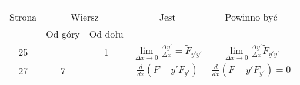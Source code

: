 \documentclass[a4paper,11pt]{article}
\begin{document}
\begin{center}

  \begin{tabular}{|c|c|c|c|c|}
    \hline
    & \multicolumn{2}{c|}{} & & \\
    Strona & \multicolumn{2}{c|}{Wiersz} & Jest
                              & Powinno być \\ \cline{2-3}
    & Od góry & Od dołu & & \\
    \hline
    25  & &  1 & $\lim\limits_{ \Delta x \to 0 }
                 \frac{ \Delta y' }{ \Delta x } = \tilde{ F }_{ y' y' }$
           & $\lim\limits_{ \Delta x \to 0 }
             \frac{ \Delta y' }{ \Delta x } \tilde{ F }_{ y' y' }$ \\
    27  &  7 & & $\frac{ d }{ dx }( F - y' F_{ y' } )$
           & $\frac{ d }{ dx }( F - y' F_{ y' } ) = 0$ \\
    \hline
  \end{tabular}

\end{center}

\vspace{\spaceTwo}


















\end{document}
